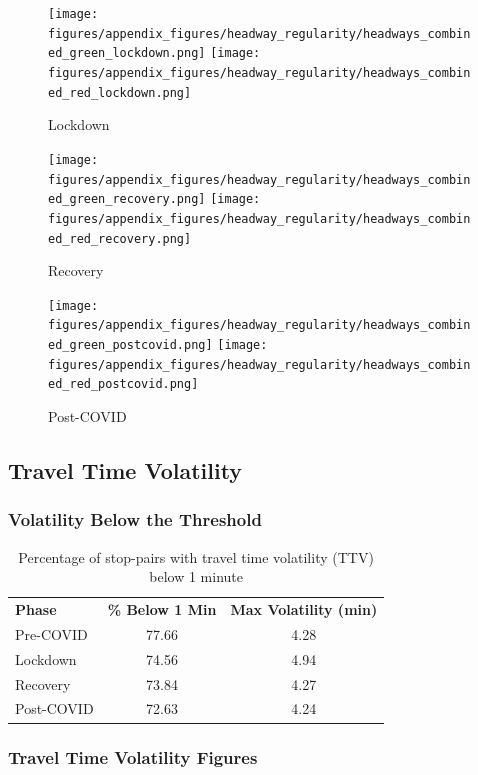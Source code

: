\begin{figure}[H]
  \centering
  \texttt{[image: figures/appendix\_figures/headway\_regularity/headways\_combined\_green\_lockdown.png]}
  \texttt{[image: figures/appendix\_figures/headway\_regularity/headways\_combined\_red\_lockdown.png]}
  \caption{Lockdown}
\end{figure}

\begin{figure}[H]
  \centering
  \texttt{[image: figures/appendix\_figures/headway\_regularity/headways\_combined\_green\_recovery.png]}
  \texttt{[image: figures/appendix\_figures/headway\_regularity/headways\_combined\_red\_recovery.png]}
  \caption{Recovery}
\end{figure}

\begin{figure}[H]
  \centering
  \texttt{[image: figures/appendix\_figures/headway\_regularity/headways\_combined\_green\_postcovid.png]}
  \texttt{[image: figures/appendix\_figures/headway\_regularity/headways\_combined\_red\_postcovid.png]}
  \caption{Post-COVID}
\end{figure}

\newpage
\subsection*{Travel Time Volatility}

\subsubsection*{Volatility Below the Threshold}
\begin{table}[H]
  \centering
  \caption{Percentage of stop-pairs with travel time volatility (TTV) below 1 minute}
  \label{tab:ttv_summary}
  \begin{tabular}{lcc}
    \textbf{Phase} & \textbf{\% Below 1 Min} & \textbf{Max Volatility (min)} \\
    Pre-COVID & 77.66 & 4.28 \\
    Lockdown  & 74.56 & 4.94 \\
    Recovery  & 73.84 & 4.27 \\
    Post-COVID & 72.63 & 4.24 \\
  \end{tabular}
\end{table}

\subsubsection*{Travel Time Volatility Figures}

